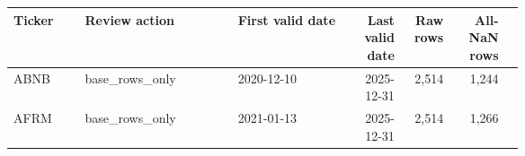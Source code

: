 \begin{tabular}{@{}p{0.14\linewidth}p{0.30\linewidth}p{0.22\linewidth}rrrr@{}}
\toprule
Ticker & Review action & First valid date & Last valid date & Raw rows & All-NaN rows \\
\midrule
ABNB & base\_\allowbreak{}rows\_\allowbreak{}only & 2020-12-10 & 2025-12-31 & 2,514 & 1,244 \\
AFRM & base\_\allowbreak{}rows\_\allowbreak{}only & 2021-01-13 & 2025-12-31 & 2,514 & 1,266 \\
\bottomrule
\end{tabular}
